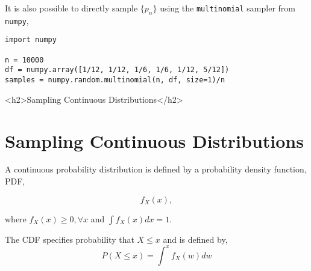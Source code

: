 \documentclass[12pt]{article}
\begin{document}
\iftex
It is also possible to directly sample $\{p_n\}$ using the \texttt{multinomial} sampler from
\texttt{numpy},

\begin{verbatim}
import numpy

n = 10000
df = numpy.array([1/12, 1/12, 1/6, 1/6, 1/12, 5/12])
samples = numpy.random.multinomial(n, df, size=1)/n
\end{verbatim}
\fi

\ifblog
<h2>Sampling Continuous Distributions</h2>
\fi
\iftex
\section{Sampling Continuous Distributions}
\fi

A continuous probability distribution is defined by a probability density function, PDF,

$$f_X(x),$$

where $f_X(x) \geq 0, \forall x$ and $\int f_X(x) dx = 1.$

The CDF specifies probability that $X \leq x$ and is defined by,
\begin{equation}
P(X \leq x) = \int^{x} f_X(w) dw
\label{eq:continuous_cdf}
\end{equation}
\end{document}
